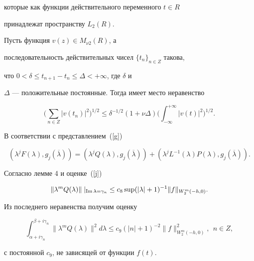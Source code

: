 которые как функции действительного переменного $t\in R$


принадлежат пространству $L_2(R)$.





\begin{lem}


Пусть функция $v(z)\in M_{\nu 2}(R)$, а


последовательность действительных чисел $\{t_n\}_{n\in Z}$ такова,


что $0<\delta\le t_{n+1}-t_n\le \Delta<+\infty$, где $\delta$ и


$\Delta$ --- положительные постоянные. Тогда имеет место неравенство


$$


\bigg(\sum\limits_{n\in Z}|v(t_n)|^2\bigg)^{1/2}\le\delta^{-1/2}(1+\nu\Delta)


\bigg(\int_{-\infty}^{+\infty}|v(t)|^2\bigg)^{1/2}.


$$


\end{lem}





В соответствии с представлением~(\ref{g})


$$


(\lambda^jF(\lambda),g_j(\overline{\lambda}))=(\lambda^jQ(\lambda),


g_j(\overline{\lambda}))+(\lambda^jL^{-1}(\lambda)P(\lambda),


g_j(\overline{\lambda})).


$$


Согласно лемме 4 и оценке~(\ref{j})


$$


\|\lambda^mQ(\lambda)\|\;|_{\im\lambda=\gamma_n}\le c_8\sup\limits(|\lambda|+1)^{-1}


\|f\|_{W_2^m(-h,0)}.


$$


Из последнего неравенства получим оценку


\begin{equation}


\label{q}


\int_{\alpha+i\gamma_n}^{\beta+i\gamma_n}\|\lambda^mQ(\lambda)\|^2d\lambda\le


c_9(|n|+1)^{-2}\|f\|_{W_2^m(-h,0)}^2,\ \ n\in Z,


\end{equation}


с постоянной $c_9$, не зависящей от функции $f(t)$.





